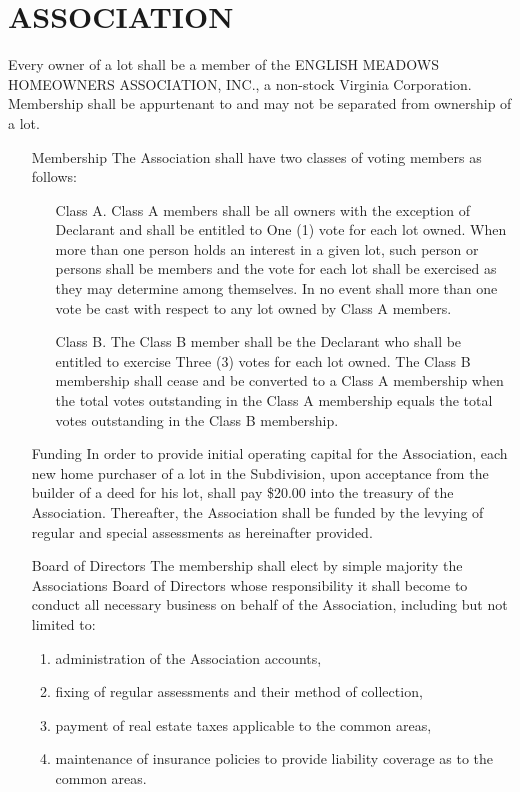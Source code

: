 \documentclass[10pt, letterpaper]{article}
\begin{document}
\section{ASSOCIATION}
Every owner of a lot shall be a member of the ENGLISH MEADOWS HOMEOWNERS ASSOCIATION, INC., a non-stock Virginia Corporation.
Membership shall be appurtenant to and may not be separated from ownership of a lot.
\begin{enumerate}
  \item[Membership] The Association shall have two classes of voting members as follows:
    \begin{itemize}
      \item[Class A.] Class A members shall be all owners with the exception of Declarant and shall be entitled to One (1) vote for each lot owned.
        When more than one person holds an interest in a given lot, such person or persons shall be members and the vote for each lot shall be exercised as they may determine among themselves.
        In no event shall more than one vote be cast with respect to any lot owned by Class A members.
      \item[Class B.] The Class B member shall be the Declarant who shall be entitled to exercise Three (3) votes for each lot owned.
        The Class B membership shall cease and be converted to a Class A membership when the total votes outstanding in the Class A membership equals the total votes outstanding in the Class B membership.
    \end{itemize}
  \item[Funding] In order to provide initial operating capital for the Association, each new home purchaser of a lot in the Subdivision, upon acceptance from the builder of a deed for his lot, shall pay \$20.00 into the treasury of the Association.
    Thereafter, the Association shall be funded by the levying of regular and special assessments as hereinafter provided.
  \item[Board of Directors] The membership shall elect by simple majority the Associations Board of Directors whose responsibility it shall become to conduct all necessary business on behalf of the Association, including but not limited to:
    \begin{enumerate}
      \item administration of the Association accounts,
      \item fixing of regular assessments and their method of collection,
      \item payment of real estate taxes applicable to the common areas,
      \item maintenance of insurance policies to provide liability coverage as to the common areas.
    \end{enumerate}
\end{enumerate}
\end{document}
